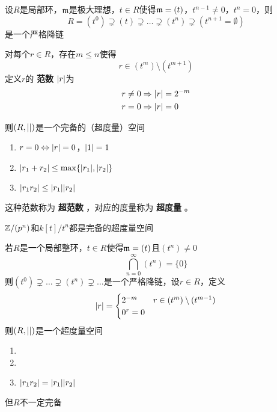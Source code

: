 \documentclass[11pt]{article}
\begin{document}
\begin{remark}
设\(R\)是局部环，\(\mathfrak{m}\)是极大理想，\(t\in R\)使得\(\mathfrak{m}=(t)\)，\(t^{n-1}\neq 0\)，\(t^n=0\)，则
\begin{equation*}
R=(t^0)\supsetneq(t)\supsetneq\dots\supsetneq(t^n)\supsetneq(t^{n+1}=\emptyset)
\end{equation*}
是一个严格降链

对每个\(r\in R\)，存在\(m\le n\)使得
\begin{equation*}
r\in(t^m)\setminus(t^{m+1})
\end{equation*}
定义\(r\)的 \textbf{范数} \(\abs{r}\)为
\begin{align*}
&r\neq 0\Rightarrow\abs{r}=2^{-m}\\
&r=0\Rightarrow\abs{r}=0
\end{align*}

则\((R,\abs{})\)是一个完备的（超度量）空间
\begin{enumerate}
\item \(r=0\Leftrightarrow\abs{r}=0\)，\(\abs{1}=1\)
\item \(\abs{r_1+r_2}\le\max\{\abs{r_1},\abs{r_2}\}\)
\item \(\abs{r_1r_2}\le\abs{r_1}\abs{r_2}\)
\end{enumerate}


这种范数称为 \textbf{超范数} ，对应的度量称为 \textbf{超度量} 。
\end{remark}

\(\mathbb{Z}/(p^n)\)和\(k[t]/t^n\)都是完备的超度量空间

\begin{remark}
若\(R\)是一个局部整环，\(t\in R\)使得\(\mathfrak{m}=(t)\)且\((t^n)\neq 0\)
\begin{equation*}
\bigcap_{n=0}^\infty(t^n)=\{0\}
\end{equation*}
则\((t^0)\supsetneq\dots\supsetneq(t^n)\supsetneq\dots\)是一个严格降链，设\(r\in R\)，定义
\begin{equation*}
\abs{r}=
\begin{cases}
2^{-m}&r\in(t^m)\setminus(t^{m-1})\\
0^r=0
\end{cases}
\end{equation*}
则\((R,\abs{})\)是一个超度量空间
\begin{enumerate}
\item 

\item 

\item \(\abs{r_1r_2}=\abs{r_1}\abs{r_2}\)
\end{enumerate}

但\(R\)不一定完备
\end{remark}
\end{document}
